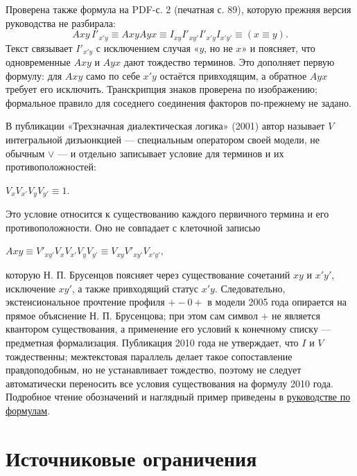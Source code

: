 \documentclass[12pt,a4paper]{article}
\begin{document}
Проверена также формула на PDF-с. 2 (печатная с. 89), которую прежняя версия руководства не разбирала:
\[
Axy\,I'_{x'y}
\equiv AxyAyx
\equiv I_{xy}I'_{xy'}I'_{x'y}I_{x'y'}
\equiv (x\equiv y).
\]
Текст связывает \(I'_{x'y}\) с исключением случая «\(y\), но не \(x\)» и поясняет, что одновременные \(Axy\) и \(Ayx\) дают тождество терминов. Это дополняет первую формулу: для \(Axy\) само по себе \(x'y\) остаётся привходящим, а обратное \(Ayx\) требует его исключить. Транскрипция знаков проверена по изображению; формальное правило для соседнего соединения факторов по-прежнему не задано.

В публикации «Трехзначная диалектическая логика» (2001) автор называет \(V\) интегральной дизъюнкцией — специальным оператором своей модели, не обычным \(\lor\) — и отдельно записывает условие для терминов и их противоположностей:

\( V_x V_{x'} V_y V_{y'} \equiv 1. \)

Это условие относится к существованию каждого первичного термина и его противоположности. Оно не совпадает с клеточной записью

\( Axy \equiv V'_{xy'} V_x V_{x'} V_y V_{y'} \equiv V_{xy} V'_{xy'} V_{x'y'}, \)

которую Н. П. Брусенцов поясняет через существование сочетаний \(xy\) и \(x'y'\), исключение \(xy'\), а также привходящий статус \(x'y\). Следовательно, экстенсиональное прочтение профиля \(+-0+\) в модели 2005 года опирается на прямое объяснение Н. П. Брусенцова; при этом сам символ \(+\) не является квантором существования, а применение его условий к конечному списку — предметная формализация. Публикация 2010 года не утверждает, что \(I\) и \(V\) тождественны; межтекстовая параллель делает такое сопоставление правдоподобным, но не устанавливает тождество, поэтому не следует автоматически переносить все условия существования на формулу 2010 года. Подробное чтение обозначений и наглядный пример приведены в \href{../docs/Как-читать-формулы-Брусенцова.tex}{руководстве по формулам}.

\section{Источниковые ограничения}
\end{document}
